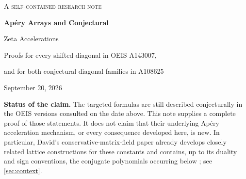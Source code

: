 \documentclass[11pt,letterpaper]{article}
\numberwithin{equation}{section}
\theoremstyle{definition}
\begin{document}
\begin{center}
{\small\scshape A self-contained research note}\par\vspace{0.65em}
{\LARGE\bfseries\color{Ink} Ap\'ery Arrays and Conjectural\par Zeta Accelerations}\par\vspace{0.7em}
{\large Proofs for every shifted diagonal in OEIS A143007,\par and for both conjectural diagonal families in A108625}\par\vspace{0.8em}
{September 20, 2026}
\end{center}
\vspace{0.5em}
\begin{abstract}
The OEIS array A143007 contains a conjectural one-parameter family of
rapidly convergent series for $\zeta(3)$. Its main diagonal consists of
the classical Ap\'ery numbers. We prove the entire family, not merely a
finite collection of numerical instances. The proof constructs a rational
potential on the nonnegative integer lattice: two explicitly certified
contiguous identities make its edge increments independent of the chosen
path, and elementary estimates identify its limit as $\zeta(3)$.
The same method proves both conjectural diagonal families for $\zeta(2)$
in A108625, at every upper and lower offset, which is the full range for
which the entry states them.
We also obtain exact finite identities, signed rational error bounds,
all monotone-path expansions, the classical Ap\'ery recurrences, a
three-term recurrence along \emph{every} shifted diagonal, certified
decimal prefixes, and sharp fixed-offset asymptotics. The accompanying
code checks 34,910 identities in exact arithmetic, in a union suite with
a second independent implementation, and verifies the finite symbolic
certificates. The analytic proof does not depend on those tests.
\end{abstract}

\noindent\textbf{Status of the claim.}
The targeted formulas are still described conjecturally in the OEIS
versions consulted on the date above. This note supplies a complete proof
of those statements. It does not claim that their underlying Ap\'ery
acceleration mechanism, or every consequence developed here, is new.
In particular, David's conservative-matrix-field paper already develops
closely related lattice constructions for these constants and contains,
up to its duality and sign conventions, the conjugate polynomials
occurring below \cite[Examples 16, 19, 25; \S5]{david}; see
\cref{sec:context}.
\end{document}
